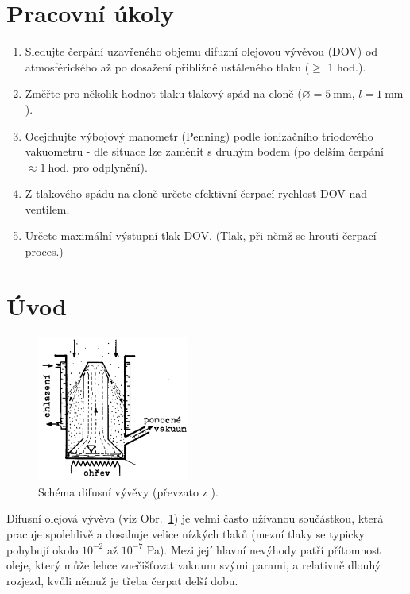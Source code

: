 \documentclass[english]{article}
\newcommand{\unit}[1]{~\mathrm{#1}}
\begin{document}


\setlength{\parindent}{0.5cm}

\section{Pracovní úkoly}
\begin{enumerate}
	\item Sledujte čerpání uzavřeného objemu difuzní olejovou vývěvou (DOV) od atmosférického až po dosažení přibližně ustáleného tlaku ($\geq$ 1 hod.).
    \item Změřte pro několik hodnot tlaku tlakový spád na cloně ($\diameter = 5\unit{mm}$, $l = 1\unit{mm}$).
	\item Ocejchujte výbojový manometr (Penning) podle ionizačního triodového vakuometru - dle situace lze zaměnit s druhým bodem (po delším čerpání  $\approx 1\unit{hod}$. pro odplynění).
	\item Z tlakového spádu na cloně určete efektivní čerpací rychlost DOV nad ventilem.
	\item Určete maximální výstupní tlak DOV. (Tlak, při němž se hroutí čerpací proces.)
\end{enumerate}

\section{Úvod}
\begin{figure}
			\centering
			\includegraphics[width=5cm]{../att/difu_schema.png}
			\caption{Schéma difusní vývěvy (převzato z \cite{bib:praskripta}).}
			\label{fig:schema_dif}
\end{figure}
Difusní olejová vývěva (viz Obr.~\ref{fig:schema_dif}) je velmi často užívanou součástkou, která pracuje spolehlivě a dosahuje velice nízkých tlaků (mezní tlaky se typicky pohybují okolo $10^{-2}$ až $10^{-7}$ Pa). Mezi její hlavní nevýhody patří přítomnost oleje, který může lehce znečišťovat vakuum svými parami, a relativně dlouhý rozjezd, kvůli němuž je třeba čerpat delší dobu. 
\end{document}
